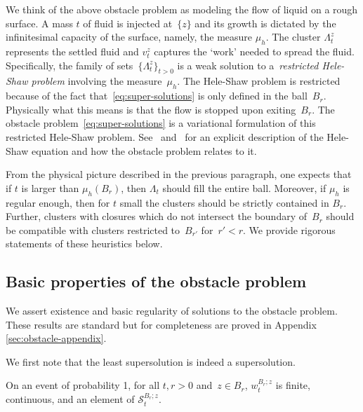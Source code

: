 \documentclass[12pt]{amsart}
\numberwithin{equation}{section}
\newcommand{\mclS}[2]{\hyperref[eq:super-solutions]{\mathcal{S}^{#1}_{#2}}}
\newcommand{\lss}[2]{\hyperref[eq:least-super-solution]{w^{#1}_{#2}}}
\newcommand{\cluster}[2]{\hyperref[eq:non-co-set]{\mathit{\Lambda}^{#1}_{#2}}}
\newcommand{\odometer}[2]{\hyperref[eq:limit-odometer]{v^{#1}_{#2}}}
\begin{document}
	
	We think of the above obstacle problem as modeling the flow of liquid on a rough surface. 
	A mass $t$ of fluid is injected at~$\{z\}$ and its growth is dictated by the infinitesimal capacity of the surface, namely, the measure $\mu_h$. The cluster ${\cluster{z}{t}}$ represents the settled fluid and $\odometer{z}{t}$ captures the `work' needed to spread the fluid. Specifically, the family of sets~$\{{\cluster{z}{t}}\}_{t > 0}$ is a weak solution 
	to a~\emph{restricted Hele-Shaw problem} involving the measure~$\mu_h$. The Hele-Shaw problem is restricted because 
	of the fact that~\eqref{eq:super-solutions} is only defined in the ball~$B_r$. Physically what this means is that the flow is stopped upon exiting~$B_r$. The obstacle problem~\eqref{eq:super-solutions}
	is a variational formulation of this restricted Hele-Shaw problem.  See~\cite[Section 3.5]{gustafsson2006conformal} and~\cite{roos2016partial} for an explicit description of the Hele-Shaw equation and how the obstacle problem relates to it. 
	
	From the physical picture described in the previous paragraph, one expects that if $t$ is larger than $\mu_h(B_r)$, then ${\cluster{}{t}}$ should fill the entire ball. Moreover, if $\mu_h$ is regular enough, then for $t$ small the clusters should be strictly contained in $B_r$. Further, clusters with closures which do not intersect the boundary of~$B_r$ should be compatible with clusters restricted to~$B_{r'}$ for~$r' < r$. We provide rigorous statements of these heuristics below. 
	
	
	
	\subsection{Basic properties of the obstacle problem} \label{subsec:basic-properties}
	We assert existence and basic regularity of solutions to the obstacle problem. These results are standard but for completeness
	are proved in Appendix \ref{sec:obstacle-appendix}. 
	
	
	
	We first note that the least supersolution is indeed a supersolution. 
	\begin{lemma}\label{lemma:basic-properties}
		On an event of probability 1, for all $t, r > 0$ and~$z \in B_r$, $\lss{B_r;z}{t}$ is finite, continuous, and an element of $\mclS{B_r;z}{t}$. 
	\end{lemma}
	
\end{document}
